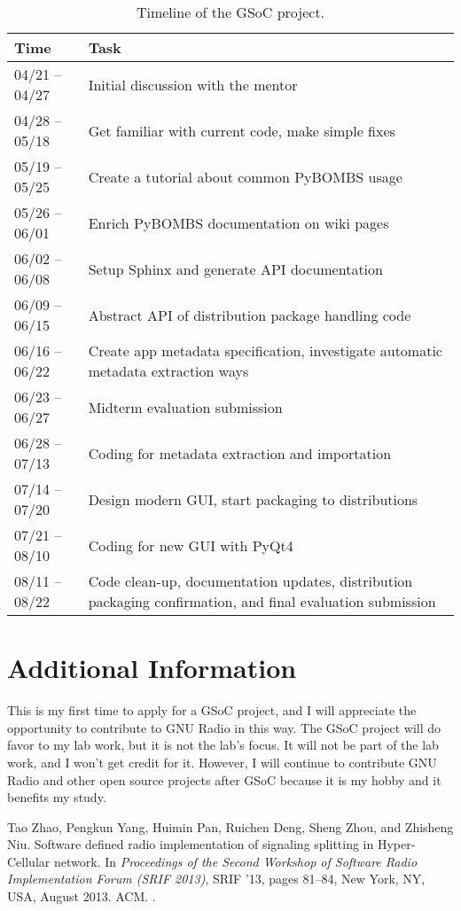 \documentclass[a4paper]{article}
\begin{document}
\begin{table}[htbp]
  \centering
  \begin{tabular}{lp{}}
    \hline
    Time & Task \\
    \hline
    04/21 -- 04/27 & Initial discussion with the mentor \\
    04/28 -- 05/18 & Get familiar with current code, make simple fixes \\
    05/19 -- 05/25 & Create a tutorial about common PyBOMBS usage\\
    05/26 -- 06/01 & Enrich PyBOMBS documentation on wiki pages \\
    06/02 -- 06/08 & Setup Sphinx and generate API documentation \\
    06/09 -- 06/15 & Abstract API of distribution package handling code \\
    06/16 -- 06/22 & Create app metadata specification, investigate
    automatic metadata extraction ways\\
    06/23 -- 06/27 & Midterm evaluation submission\\
    06/28 -- 07/13 & Coding for metadata extraction and importation \\
    07/14 -- 07/20 & Design modern GUI, start packaging to distributions \\
    07/21 -- 08/10 & Coding for new GUI with PyQt4 \\
    08/11 -- 08/22 & Code clean-up, documentation updates, distribution
    packaging confirmation, and final evaluation submission \\
    \hline
  \end{tabular}
  \caption{Timeline of the GSoC project.}
  \label{tab:timeline}
\end{table}

\section*{Additional Information}

This is my first time to apply for a GSoC project, and I will appreciate
the opportunity to contribute to GNU Radio in this way.  The GSoC
project will do favor to my lab work, but it is not the lab's focus. It
will not be part of the lab work, and I won't get credit for it.
However, I will continue to contribute GNU Radio and other open source
projects after GSoC because it is my hobby and it benefits my study.

\begin{thebibliography}{1}

Tao Zhao, Pengkun Yang, Huimin Pan, Ruichen Deng, Sheng Zhou, and Zhisheng Niu.
\newblock Software defined radio implementation of signaling splitting in
  {Hyper-Cellular} network.
\newblock In {\em Proceedings of the Second Workshop of Software Radio
  Implementation Forum (SRIF 2013)}, SRIF '13, pages 81--84, New York, NY, USA,
  August 2013. ACM.
\newblock \href {http://dx.doi.org/10.1145/2491246.2491258}
  {}.

\end{thebibliography}
\end{document}
